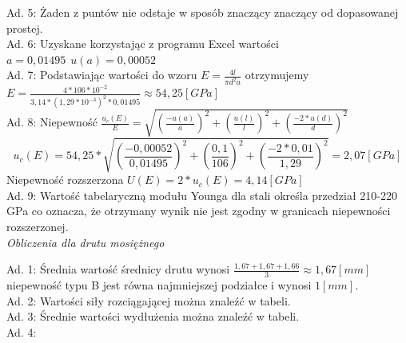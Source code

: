 \documentclass[a4paper,10pt,twoside]{article}
\begin{document}
\begin{figure}[h]
\end{figure}
\noindent
Ad. 5: Żaden z puntów nie odstaje w sposób znaczący znaczący od dopasowanej prostej.\\
Ad. 6: Uzyskane korzystając z programu Excel wartości $a = 0,01495 \hspace{5pt}u(a) = 0,00052$\\
Ad. 7: Podstawiając wartości do wzoru $E = \frac{4l}{\pi d^2 a}$ otrzymujemy $E = \frac{4*106*10^{-2}}{3,14 * (1,29*10^{-3})^2 * 0,01495} \approx 54,25[GPa]$\\
Ad. 8: Niepewność $\frac{u_c(E)}{E} = \sqrt{\left (\frac{-u(a)}{a} \right )^2 + \left (\frac{u(l)}{l} \right )^2 + \left (\frac{-2*u(d)}{d} \right )^2}$ $$u_c(E) = 54,25*\sqrt{\left (\frac{-0,00052}{0,01495} \right )^2 + \left (\frac{0,1}{106} \right )^2 + \left (\frac{-2*0,01}{1,29} \right )^2} = 2,07[GPa]$$ Niepewność rozszerzona $U(E) = 2*u_c(E) = 4,14[GPa]$\\
Ad. 9: Wartość tabelaryczną modułu Younga dla stali określa przedział 210-220 GPa co oznacza, że otrzymany wynik nie jest zgodny w granicach niepewności rozszerzonej.\vspace{15pt}\\
\noindent
\textit{Obliczenia dla drutu mosiężnego}

\noindent Ad. 1: Średnia wartość średnicy drutu wynosi $\frac{1,67 + 1,67 + 1,66}{3} \approx 1,67[mm]$ niepewność typu B jest równa najmniejszej podziałce i wynosi $1[mm]$.\\
Ad. 2: Wartości siły rozciągającej można znaleźć w tabeli.\\
Ad. 3: Średnie wartości wydłużenia można znaleźć w tabeli.\\
Ad. 4: 
\end{document}
